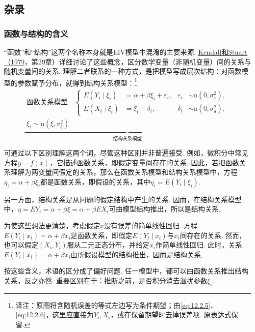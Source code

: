 \subsection{杂录}\label{sec:12.6}
\subsubsection{函数与结构的含义}\label{sec:12.6.1}
“函数”和“结构”这两个名称本身就是EIV模型中混淆的主要来源. \hyperref[bib:source189]{Kendall和Stuart（1979}，第29章）详细讨论了这些概念，区分数学变量（非随机变量）间的关系与随机变量间的关系. 理解二者联系的一种方式，是把模型写成层次结构：对函数模型的参数赋予分布，就得到结构关系模型：\footnote{译注：原图将含随机误差的等式左边写为条件期望；由\eqref{eq:12.2.5}、\eqref{eq:12.2.6}，这里应直接为$Y_i,X_i$，或在保留期望时去掉误差项. 原表达式保留.}
$$\underbrace{\begin{aligned}
\text{函数关系模型}\quad\left\{\begin{aligned}
E(Y_i\mid\xi_i)&=\alpha+\beta\xi_i+\varepsilon_i,&\varepsilon_i&\sim\mathrm n(0,\sigma_\varepsilon^2),\\
E(X_i\mid\xi_i)&=\xi_i+\delta_i,&\delta_i&\sim\mathrm n(0,\sigma_\delta^2),
\end{aligned}\right.\\
\xi_i\sim\mathrm n(\xi,\sigma_\xi^2)
\end{aligned}}_{\text{结构关系模型}}$$

可通过以下区别理解这两个词，尽管这种区别并非普遍接受. 例如，微积分中常见方程$y=f(x)$，它描述函数关系，即假定变量间存在的关系. 因此，若把函数关系理解为两变量间假定的关系，那么在函数关系模型和结构关系模型中，方程$\eta_i=\alpha+\beta\xi_i$都是函数关系，即假设的关系，其中$\eta_i=E(Y_i\mid\xi_i)$.

另一方面，结构关系是从问题的假定结构中产生的关系. 因而，在结构关系模型中，$\eta=EY_i=\alpha+\beta\xi=\alpha+\beta EX_i$可由模型结构推出，所以是结构关系.

为使这些想法更清楚，考虑假定$x$没有误差的简单线性回归. 方程$E(Y_i\mid x_i)=\alpha+\beta x_i$是函数关系，即假定$E(Y_i\mid x_i)$与$x_i$间存在的关系. 然而，也可以假定$(X_i,Y_i)$服从二元正态分布，并给定$x_i$作简单线性回归. 此时，关系$E(Y_i\mid x_i)=\alpha+\beta x_i$由所假设模型的结构推出，因而是结构关系.

按这些含义，术语的区分成了偏好问题. 任一模型中，都可以由函数关系推出结构关系，反之亦然. 重要区别在于：推断之前，是否积分消去滋扰参数$\xi_i$.

